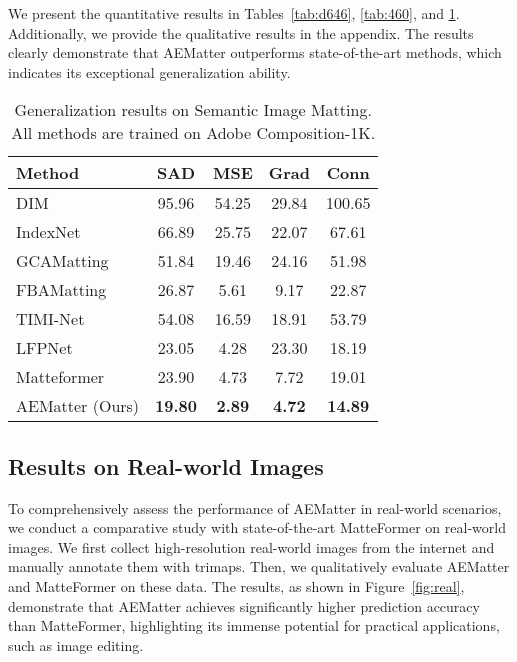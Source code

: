 \documentclass[10pt,twocolumn,letterpaper]{article}
\begin{document}
We present the quantitative results in Tables~\ref{tab:d646}, \ref{tab:460}, and \ref{tab:simd}.
Additionally, we provide the qualitative results in the appendix.
The results clearly demonstrate that AEMatter outperforms state-of-the-art methods, which indicates its exceptional generalization ability.



\begin{table}[!t]
  \centering
  \caption{Generalization results on Semantic Image Matting. All methods are trained on Adobe Composition-1K.} \begin{tabular}{l|c|c|c|c}
        \toprule
    Method & {SAD} & {MSE} & {Grad} & {Conn} \\
    \midrule
    DIM~\cite{xu2017deep} & 95.96&54.25&29.84&100.65 \\ IndexNet~\cite{lu2019indices} & 66.89&25.75&22.07&67.61\\ GCAMatting~\cite{li2020natural} &51.84&19.46&24.16&51.98\\  FBAMatting~\cite{forte2020fbamatting} & 26.87 &5.61 & 9.17 & 22.87 \\TIMI-Net~\cite{Liu_2021_ICCV} & 54.08& 16.59 &18.91& 53.79\\ LFPNet~\cite{liu2021lfpnet} & 23.05&4.28&23.30&18.19 \\ Matteformer~\cite{park2022matteformer} & 23.90&4.73&7.72&19.01 \\\midrule
    AEMatter (Ours)   &\bf{19.80}&\bf{2.89}&\bf{4.72}&\bf{14.89} \\ \bottomrule
    \end{tabular}\vspace{-0.2cm}
  \label{tab:simd}\end{table}


\subsection{Results on Real-world Images}
To comprehensively assess the performance of AEMatter in real-world scenarios, we conduct a comparative study with state-of-the-art MatteFormer on real-world images. 
We first collect high-resolution real-world images from the internet and manually annotate them with trimaps.
Then, we qualitatively evaluate AEMatter and MatteFormer on these data. 
The results, as shown in Figure~\ref{fig:real}, demonstrate that AEMatter achieves significantly higher prediction accuracy than MatteFormer, highlighting its immense potential for practical applications, such as image editing.
\end{document}
